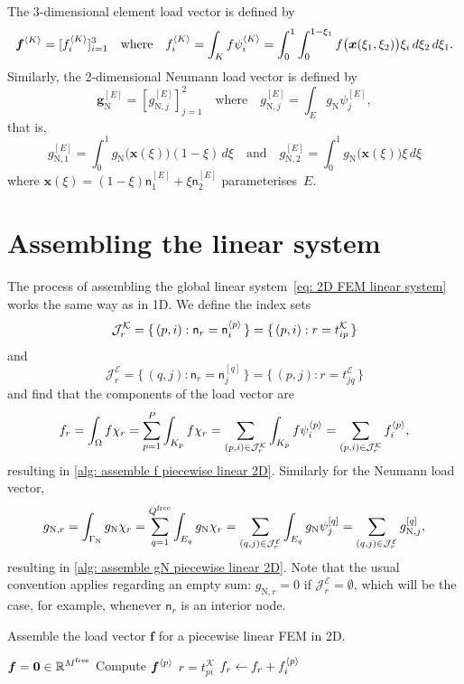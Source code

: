 The 3-dimensional element load vector is defined by
\[
\boldsymbol{f}^{\langle K\rangle}=[f^{\langle K\rangle}_i]_{i=1}^3
\quad\text{where}\quad
f^{\langle K\rangle}_i=\int_K f\psi^{\langle K\rangle}_i
	=\int_0^1\int_0^{1-\xi_1}f\bigl(\boldsymbol{x}(\xi_1,\xi_2)\bigr)\xi_i
	\,d\xi_2 \,d\xi_1.
\]
Similarly, the 2-dimensional Neumann load vector is defined by
\[
\boldsymbol{g}^{[E]}_{\mathrm{N}}=[g^{[E]}_{\mathrm{N},j}]_{j=1}^2
\quad\text{where}\quad
g^{[E]}_{\mathrm{N},j}=\int_E g_{\mathrm{N}}\psi^{[E]}_j,
\]
that is,
\[
g^{[E]}_{\mathrm{N},1}
    =\int_0^1g_{\mathrm{N}}\bigl(\boldsymbol{x}(\xi)\bigr)(1-\xi)\,d\xi
\quad\text{and}\quad
g^{[E]}_{\mathrm{N},2}
    =\int_0^1g_{\mathrm{N}}\bigl(\boldsymbol{x}(\xi)\bigr)\xi\,d\xi
\]
where $\boldsymbol{x}(\xi)=(1-\xi)\mathsf{n}^{[E]}_1+\xi\mathsf{n}^{[E]}_2$
parameterises~$E$.


\section{Assembling the linear system}

The process of assembling the global linear
system~\eqref{eq: 2D FEM linear system} works the same way as in 1D.  We
define the index sets
\[
\mathcal{J}^{\mathcal{K}}_r=\{\,(p,i):\mathsf{n}_r=\mathsf{n}^{\langle p\rangle}_i\,\}
    =\{\,(p,i):r=t^{\mathcal{K}}_{ip}\,\}
\]
and
\[
\mathcal{J}^{\mathcal{E}}_r=\{\,(q,j):\mathsf{n}_r=\mathsf{n}^{[q]}_j\,\}
    =\{\,(p,j):r=t^{\mathcal{E}}_{jq}\,\}
\]
and find that the components of the load vector are
\[
f_r=\int_\Omega f\chi_r=\sum_{p=1}^P\int_{K_p}f\chi_r
    =\sum_{(p,i)\in\mathcal{J}^{\mathcal{K}}_r}\int_{K_p}f\psi^{\langle p\rangle}_i
    =\sum_{(p,i)\in\mathcal{J}^{\mathcal{K}}_r}f^{\langle p\rangle}_i,
\]
resulting in \cref{alg: assemble f piecewise linear 2D}. Similarly for the
Neumann load vector,
\[
g_{\mathrm{N},r}=\int_{\Gamma_{\mathrm{N}}}g_{\mathrm{N}}\chi_r
    =\sum_{q=1}^{Q^{\mathrm{free}}}\int_{E_q}g_{\mathrm{N}}\chi_r
    =\sum_{(q,j)\in\mathcal{J}^{\mathcal{E}}_r}
        \int_{E_q}g_{\mathrm{N}}\psi^{[q]}_j
    =\sum_{(q,j)\in\mathcal{J}^{\mathcal{E}}_r}g_{\mathrm{N},j}^{[q]},
\]
resulting in \cref{alg: assemble gN piecewise linear 2D}.  Note that
the usual convention applies regarding an empty sum: $g_{\mathrm{N},r}=0$ if
$\mathcal{J}^{\mathcal{E}}_r=\emptyset$, which will be the case, for example,
whenever $\mathsf{n}_r$ is an interior node.

\begin{algorithm}
\caption{Assemble the load vector $\boldsymbol{f}$ for a piecewise linear FEM in
2D.}\label{alg: assemble f piecewise linear 2D}
\begin{algorithmic}
\State $\boldsymbol{f}=\boldsymbol{0}\in\mathbb{R}^{M^{\mathrm{free}}}$
    \State Compute $\boldsymbol{f}^{\langle p\rangle}$
        \State $r=t^{\mathcal{K}}_{pi}$
            \State $f_r\gets f_r+f^{\langle p\rangle}_i$
        \EndIf
    \EndFor
\EndFor
\end{algorithmic}
\end{algorithm}

